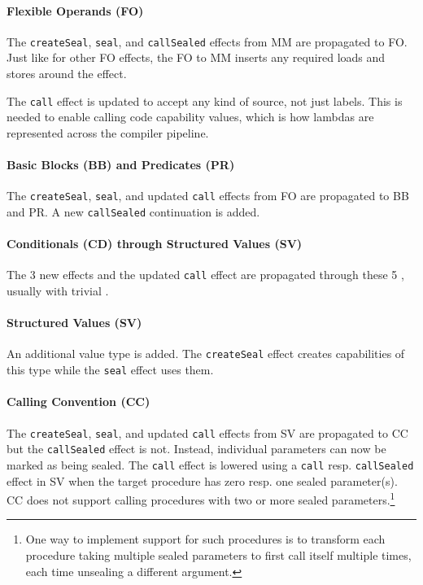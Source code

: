 \documentclass[main.tex]{subfiles}
\begin{document}
\paragraph{Flexible Operands (FO)} The \texttt{createSeal}, \texttt{seal}, and \texttt{callSealed} effects from MM are propagated to FO. Just like for other FO effects, the FO to MM  inserts any required loads and stores around the \lowered{} effect.

The \texttt{call} effect is updated to accept any kind of source, not just labels. This is needed to enable calling code capability values, which is how lambdas are represented across the compiler pipeline.

\paragraph{Basic Blocks (BB) and Predicates (PR)} The \texttt{createSeal}, \texttt{seal}, and updated \texttt{call} effects from FO are propagated to BB and PR. A new \texttt{callSealed} continuation is added.

\paragraph{Conditionals (CD) through Structured Values (SV)} The 3 new effects and the updated \texttt{call} effect are propagated through these 5 , usually with trivial .

\paragraph{Structured Values (SV)} An additional  value type is added. The \texttt{createSeal} effect creates capabilities of this type while the \texttt{seal} effect uses them.

\paragraph{Calling Convention (CC)} The \texttt{createSeal}, \texttt{seal}, and updated \texttt{call} effects from SV are propagated to CC but the \texttt{callSealed} effect is not. Instead, individual parameters can now be marked as being sealed. The \texttt{call} effect is lowered using a \texttt{call} resp. \texttt{callSealed} effect in SV when the target procedure has zero resp. one sealed parameter(s). CC does not support calling procedures with two or more sealed parameters.\footnote{One way to implement support for such procedures is to transform each procedure taking multiple sealed parameters to first call itself multiple times, each time unsealing a different argument.}
\end{document}
